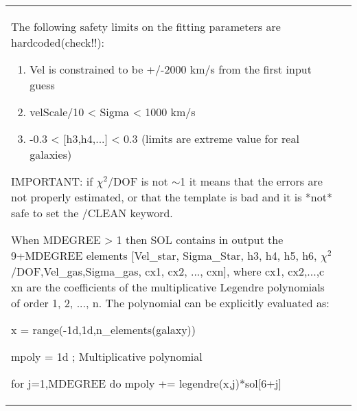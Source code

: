 \documentclass[11pt]{book}
\begin{document}
\begin{center}
\begin{longtable}{p{2.7cm}| p{11.1cm}}
       The following safety limits on the fitting parameters are hardcoded(check!!):
      \begin{enumerate}
         \item Vel is constrained to be +/-2000 km/s from the first input guess
         \item velScale/10 < Sigma < 1000 km/s
         \item -0.3 < [h3,h4,...] < 0.3 (limits are extreme value for real galaxies)
           \end{enumerate}

       IMPORTANT: if $\chi^2$/DOF is not $\sim$1 it means that the errors are not
       properly estimated, or that the template is bad and it is *not* safe
       to set the /CLEAN keyword.

      When MDEGREE > 1 then SOL contains in output the 9+MDEGREE elements
       [Vel\_star, Sigma\_Star, h3, h4, h5, h6,  $\chi^2$/DOF,Vel\_gas,Sigma\_gas, 
       cx1, cx2, ..., cxn], where cx1, cx2,...,c xn
       are the coefficients of the multiplicative Legendre polynomials
       of order 1, 2, ..., n. The polynomial can be explicitly evaluated as:

           x = range(-1d,1d,n\_elements(galaxy))

           mpoly = 1d ; Multiplicative polynomial

           for j=1,MDEGREE do mpoly += legendre(x,j)*sol[6+j]


\end{longtable}
\end{center}
\end{document}
